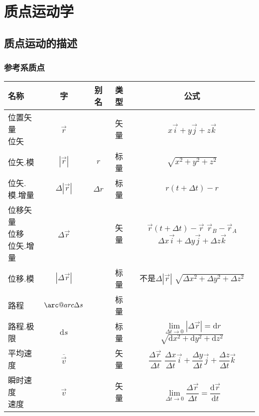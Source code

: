 \documentclass[UTF8,a4paper,12pt,scheme=chinese]{ctexbook}
\makeatletter
\newcommand{\sll}[1]{\overrightarrow{#1}}
\newcommand{\ud}{\mathrm{d}}
\newcommand{\arc@char}{{\usefont{U}{tipa}{m}{n}\symbol{62}}}%
\newcommand{\arc}[1]{\mathpalette\arc@arc{#1}}
\newcommand{\arc@arc}[2]{%
	\sbox0{$\m@th#1#2$}%
	\vbox{
		\hbox{\resizebox{\wd0}{\height}{\arc@char}}
		\nointerlineskip
		\box0
	}%
}
\makeatother
\begin{document}
	\chapter{质点运动学}
	\section{质点运动的描述}
	\subsection{参考系\quad 质点}
	\begin{longtable}{|l|c|c|c|c|}
		\hline 
		名称 & 字 & 别名 & 类型 & 公式\\ 
		\hline 
		\makecell[l]{位置矢量\\位矢} & $ \sll{r} $ &  & 矢量 & $ x\sll{i}+y\sll{j}+z\sll{k} $\\ 
		\hline
		位矢.模 & $ |\sll{r}| $ & $ r $ & 标量 & $ \sqrt{x^2+y^2+z^2} $\\
		\hline
		位矢.模.增量 & $ \Delta|\sll{r}| $ & $ \Delta{r} $ & 标量 & $ {r}(t+\Delta{t})-{r} $\\
		\hline
		\makecell[l]{位移矢量\\位移\\位矢.增量} & $ \Delta\sll{r} $ &  & 矢量 & 
		\makecell{
		$ \sll{r}(t+\Delta{t})-\sll{r} $\\
		$ \sll{r}_B-\sll{r}_A $\\
		$ \Delta x\sll{i}+\Delta y\sll{j} + \Delta z\sll{k} $
		}\\
		\hline
		位移.模 & $ |\Delta\sll{r}| $ &   & 标量 & \makecell{不是$ \Delta|\sll{r}| $\\$ \sqrt{\Delta x^2+\Delta y^2+\Delta z^2} $}\\
		\hline
		路程 & $ \arc{\Delta s} $ &  & 标量 & \\
		\hline
		路程.极限 & $ \ud s $ &  & 标量 & \makecell{$ \lim\limits_{\Delta t \rightarrow 0}|\Delta \sll{r}|=\ud r $\\$ \sqrt{\ud x^2+\ud y^2+\ud z^2} $}\\
		\hline
		平均速度 & $ \overline{\sll{v}} $ &  & 矢量 & \makecell*[c]{
			$ \dfrac{\Delta \sll{r}}{\Delta t} $\\[2ex]
			$ \dfrac{\Delta x}{\Delta t}\sll{i}+\dfrac{\Delta y}{\Delta t}\sll{j}+\dfrac{\Delta z}{\Delta t}\sll{k} $
		}\\[2ex]
		\hline
		\makecell[l]{瞬时速度\\速度} & $ \sll{v} $ &  & 矢量 & $ \lim\limits_{\Delta t \rightarrow 0}\dfrac{\Delta \sll{r}}{\Delta t}=\dfrac{\ud \sll{r}}{\ud t} $\\

\end{longtable}
\end{document}

